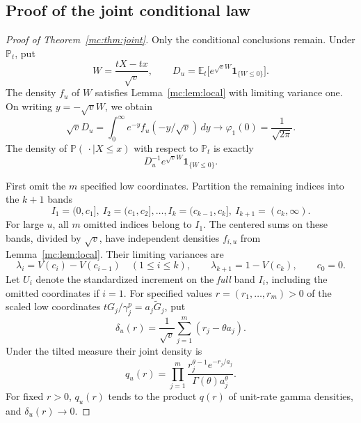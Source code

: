 \subsection{Proof of the joint conditional law}

\begin{proof}[Proof of Theorem~\ref{mc:thm:joint}]
Only the conditional conclusions remain.  Under $\mathbb P_t$, put
\[
 W=\frac{tX-tx}{\sqrt v},\qquad
 D_u=\mathbb E_t\bigl[e^{\sqrt vW}\mathbf1_{\{W\leq0\}}\bigr].
\]
The density $f_u$ of $W$ satisfies Lemma~\ref{mc:lem:local} with
limiting variance one.  On writing $y=-\sqrt vW$, we obtain
\begin{equation}\label{mc:eq:D}
 \sqrt vD_u=\int_0^\infty e^{-y}f_u(-y/\sqrt v)\,dy
 \longrightarrow\varphi_1(0)=\frac1{\sqrt{2\pi}}.
\end{equation}
The density of $\mathbb P(\,\cdot\mid X\leq x)$ with respect to
$\mathbb P_t$ is exactly
\begin{equation}\label{mc:eq:condition-weight}
 D_u^{-1}e^{\sqrt vW}\mathbf1_{\{W\leq0\}}.
\end{equation}

First omit the $m$ specified low coordinates.  Partition the remaining
indices into the $k+1$ bands
\[
 I_1=(0,c_1],\ I_2=(c_1,c_2],\ldots,
 I_k=(c_{k-1},c_k],\ I_{k+1}=(c_k,\infty).
\]
For large $u$, all $m$ omitted indices belong to $I_1$.
The centered sums on these bands, divided by $\sqrt v$, have independent
densities $f_{i,u}$ from Lemma~\ref{mc:lem:local}.  Their limiting
variances are
\[
 \lambda_i=V(c_i)-V(c_{i-1})\quad(1\leq i\leq k),
 \qquad \lambda_{k+1}=1-V(c_k),\qquad c_0=0.
\]
Let $U_i$ denote the standardized increment on the \emph{full} band
$I_i$, including the omitted coordinates if $i=1$.  For specified values
$r=(r_1,\ldots,r_m)>0$ of the scaled low coordinates
$tG_j/\gamma_j^p=a_j\widetilde G_j$, put
\[
 \delta_u(r)=\frac1{\sqrt v}\sum_{j=1}^m(r_j-\theta a_j).
\]
Under the tilted measure their joint density is
\[
 q_u(r)=\prod_{j=1}^m
 \frac{r_j^{\theta-1}e^{-r_j/a_j}}
      {\Gamma(\theta)a_j^\theta}.
\]
For fixed $r>0$, $q_u(r)$ tends to the product $q(r)$ of unit-rate gamma
densities, and $\delta_u(r)\to0$.


\end{proof}

